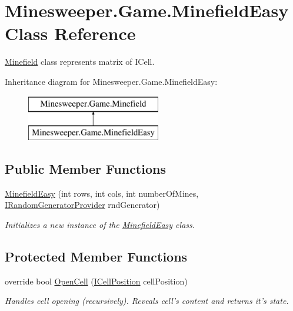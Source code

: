 \hypertarget{class_minesweeper_1_1_game_1_1_minefield_easy}{\section{Minesweeper.\+Game.\+Minefield\+Easy Class Reference}
\label{class_minesweeper_1_1_game_1_1_minefield_easy}
}


\hyperlink{class_minesweeper_1_1_game_1_1_minefield}{Minefield} class represents matrix of I\+Cell.  


Inheritance diagram for Minesweeper.\+Game.\+Minefield\+Easy\+:\begin{figure}[H]
\begin{center}
\leavevmode
\includegraphics[height=2.000000cm]{class_minesweeper_1_1_game_1_1_minefield_easy}
\end{center}
\end{figure}
\subsection*{Public Member Functions}
\begin{DoxyCompactItemize}
\item 
\hyperlink{class_minesweeper_1_1_game_1_1_minefield_easy_acf546e6d351031a3e4840bcfd9a1cd77}{Minefield\+Easy} (int rows, int cols, int number\+Of\+Mines, \hyperlink{interface_minesweeper_1_1_lib_1_1_i_random_generator_provider}{I\+Random\+Generator\+Provider} rnd\+Generator)
\begin{DoxyCompactList}\small\item\em Initializes a new instance of the \hyperlink{class_minesweeper_1_1_game_1_1_minefield_easy}{Minefield\+Easy} class. \end{DoxyCompactList}\end{DoxyCompactItemize}
\subsection*{Protected Member Functions}
\begin{DoxyCompactItemize}
\item 
override bool \hyperlink{class_minesweeper_1_1_game_1_1_minefield_easy_ad66c9eb0e3876d537f2ea7a9f548410c}{Open\+Cell} (\hyperlink{interface_minesweeper_1_1_lib_1_1_i_cell_position}{I\+Cell\+Position} cell\+Position)
\begin{DoxyCompactList}\small\item\em Handles cell opening (recursively). Reveals cell's content and returns it's state. \end{DoxyCompactList}\end{DoxyCompactItemize}

